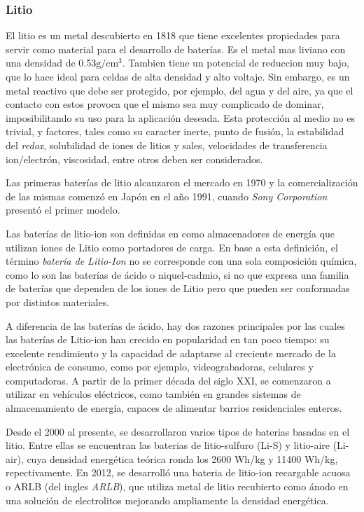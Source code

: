 \documentclass[10pt,a4paper]{article}
\begin{document}
    \subsubsection{Litio}

    El litio es un metal descubierto en 1818 que tiene excelentes 
    propiedades para servir como material para el desarrollo de baterías. 
    Es el metal mas liviano con una densidad de 0.53$\mathrm{g/cm^3}$. 
    Tambien tiene un potencial de reduccion muy bajo, que lo hace ideal para 
    celdas de alta densidad y alto voltaje. Sin embargo, es un metal 
    reactivo que debe ser protegido, por ejemplo, del agua y del aire, 
    ya que el contacto con estos provoca que el mismo sea muy complicado de 
    dominar, imposibilitando su uso para la aplicación deseada. 
    Esta protección al medio no es trivial, y factores, tales como 
    su caracter inerte, punto de fusión, la estabilidad del \emph{redox}, 
    solubilidad de iones de litios y sales, velocidades de transferencia 
    ion/electrón, viscosidad, entre otros deben ser considerados.
    
    \noindent Las primeras baterías de litio alcanzaron el mercado en 1970 y la 
    comercialización de las mismas comenzó en Japón en el año
    1991, cuando \emph{Sony Corporation} presentó el primer modelo.
    
	\noindent Las baterías de litio-ion son definidas en \cite{def_liion} como 
    almacenadores de energía que utilizan iones de Litio como portadores de 
    carga. En base a esta definición, el término \emph{batería de Litio-Ion} no 
    se corresponde con una sola composición química, como lo son las baterías 
    de ácido o niquel-cadmio, si no que expresa una familia de baterías que 
    dependen de los iones de Litio pero que pueden ser conformadas por 
    distintos materiales.
    
    \noindent A diferencia de las baterías de ácido, hay dos razones principales por las 
    cuales las baterías de Litio-ion han crecido en popularidad en tan poco 
    tiempo: su excelente rendimiento y la capacidad de adaptarse al creciente 
    mercado de la electrónica de consumo, como por ejemplo, videograbadoras, 
    celulares y computadoras. A partir de la primer década del siglo XXI, se 
    comenzaron a utilizar en vehículos eléctricos, como también en grandes 
    sistemas de almacenamiento de energía, capaces de alimentar barrios 
    residenciales enteros.
    
    \noindent Desde el 2000 al presente, se desarrollaron varios
    tipos de baterias basadas en el litio. Entre ellas se encuentran las
    baterias de litio-sulfuro (Li-S) y litio-aire (Li-air), cuya densidad
    energética teórica ronda los 2600 Wh/kg y 11400 Wh/kg, repectivamente. En
    2012, se desarrolló una bateria de litio-ion recargable acuosa o \acrshort{ARLB} (del
    ingles \emph{\acrlong{ARLB}}), 
    que utiliza metal de litio recubierto como ánodo en una solución de 
    electrolitos mejorando ampliamente la densidad energética.
\end{document}
